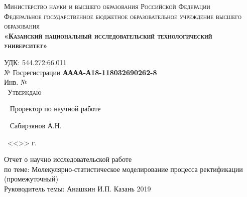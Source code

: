 \begin{center}
	\textsc{\large{Министерство науки и высшего образования Российской Федерации}\\
	\footnotesize{Федеральное государственное бюджетное образовательное учреждение высшего образования}\\ 
	\small{\textbf{«Казанский национальный исследовательский технологический университет»}}\\}
\end{center}

	\hfill \break
	\normalsize{УДК: 544.272:66.011}\\
	\normalsize{№ Госрегистрации \textbf{АААА-А18-118032690262-8}}\\
	\normalsize{Инв. №}\\
	
	\large
	~\hspace{9cm}\textsc{Утверждаю}
	
	~\hspace{7cm} Проректор по научной работе
	
	~\hspace{7cm}\underline{\hspace{3cm}} Сабирзянов А.Н.
	
	~\hspace{7cm}<<\underline{\hspace{1cm}}>> \underline{\hspace{4cm}} г.
	
	\hfill \break
\begin{center}
	\Large{Отчет о научно исследовательской работе}\\
	\hfill \break
	\Large{по теме: Молекулярно-статистическое моделирование процесса ректификации\\(промежуточный)}\\
	\hfill \break
	\hfill \break
	\normalsize
	\large
Руководитель темы:\hspace{4cm}   \underline{\hspace{2.5cm}} Анашкин И.П.
\hfill \break
\vspace{8cm}
\hfill \break
 Казань 2019
\end{center}
\thispagestyle{empty} %


\newpage

